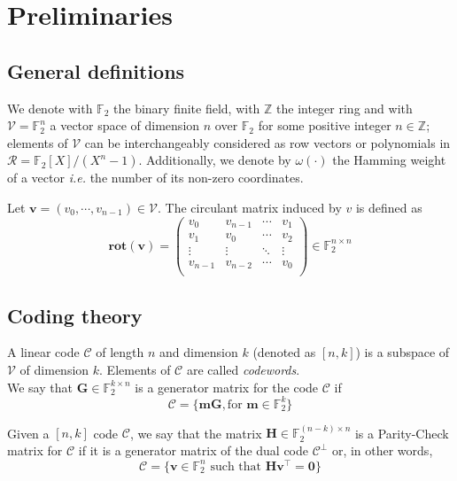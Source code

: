 \section{Preliminaries}\label{preliminaries}
\subsection*{\textbf{General definitions}}
We denote with $\mathds{F}_{2}$ the binary finite field, with $\mathds{Z}$ the integer ring and with ${\mathcal{V} = \mathds{F}_{2}^{n}}$ a vector space of dimension $n$ over $\mathds{F}_2$ for some positive integer $n \in \mathds{Z}$; 
elements of $\mathcal{V}$ can be interchangeably considered as row vectors or polynomials in ${\mathcal{R} = \mathds{F}_{2}[X]/(X^n-1)}$.
Additionally, we denote by $\omega(\cdot)$ the Hamming weight of a vector \textit{i.e.} the number of its non-zero coordinates.

Let ${\mathbf{v} = (v_0, \cdots, v_{n-1}) \in \mathcal{V}}$. The circulant matrix induced by $v$ is defined as
\begin{equation*}
    \textbf{rot}(\mathbf{v}) = 
    \begin{pmatrix}
        v_0 & v_{n-1} & \cdots & v_1 \\
        v_1 & v_0 & \cdots & v_2 \\
        \vdots & \vdots & \ddots & \vdots \\
        v_{n-1} & v_{n-2} & \cdots & v_0 \\
    \end{pmatrix}
    \in \mathds{F}_{2}^{n\times n}
\end{equation*}

\subsection*{\textbf{Coding theory}\cite{macwilliams1977theory}}
A linear code $\mathcal{C}$ of length $n$ and dimension $k$ (denoted as $[n, k]$) is a subspace of $\mathcal{V}$ of dimension $k$. Elements of $\mathcal{C}$ are called \textit{codewords}.\\

We say that ${\textbf{G} \in \mathds{F}^{k\times n}_{2}}$ is a generator matrix for the code $\mathcal{C}$ if
\begin{equation*}
    \mathcal{C} = \lbrace \textbf{mG}, \text{for } \textbf{m} \in \mathds{F}_2^k \rbrace
\end{equation*}

Given a $[n, k]$ code $\mathcal{C}$, we say that the matrix ${\mathbf{H}\in\mathds{F}_2^{(n-k)\times n}}$ is a Parity-Check matrix for $\mathcal{C}$ if it is a generator matrix of the dual code $\mathcal{C}^{\bot}$ or, in other words, 
\begin{equation*}
\mathcal{C} = \lbrace \mathbf{v} \in \mathds{F}_2^n \text{ such that } \mathbf{Hv^{\top}} = \mathbf{0} \rbrace
\end{equation*}

